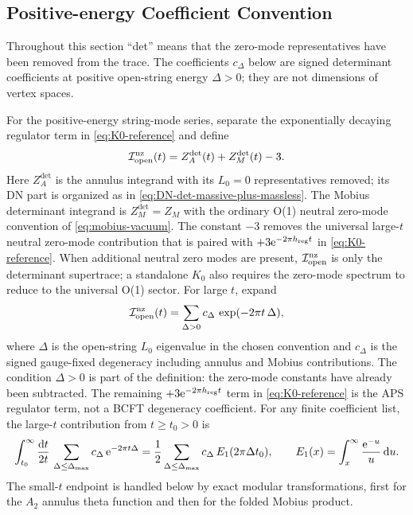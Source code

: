 \documentclass[11pt]{article}
\newcommand{\dd}{\mathrm{d}}
\newcommand{\e}{\mathrm{e}}
\begin{document}
\subsection{Positive-energy Coefficient Convention}

Throughout this section ``det'' means that the zero-mode representatives have been removed from
the trace. The coefficients \(c_\Delta\) below are signed determinant coefficients at positive
open-string energy \(\Delta>0\); they are not dimensions of vertex spaces.

For the positive-energy string-mode series, separate the exponentially decaying regulator term
in \eqref{eq:K0-reference} and define
\begin{equation}
  \mathcal I_{\rm open}^{\rm nz}(t)
  =
  Z_A^{\det}(t)+Z_M^{\det}(t)
  -
  3 .
  \label{eq:open-channel-det-integrand}
\end{equation}
Here \(Z_A^{\det}\) is the annulus integrand with its \(L_0=0\) representatives removed; its DN
part is organized as in \eqref{eq:DN-det-massive-plus-massless}. The Mobius determinant integrand
is \(Z_M^{\det}=Z_M\) with the ordinary O(1) neutral zero-mode convention of
\eqref{eq:mobius-vacuum}. The constant \(-3\) removes the universal large-\(t\) neutral zero-mode
contribution that is paired with \(+3\e^{-2\pi h_{\rm reg}t}\) in \eqref{eq:K0-reference}. When
additional neutral zero modes are present, \(\mathcal I_{\rm open}^{\rm nz}\) is only the
determinant supertrace; a standalone \(K_0\) also requires the zero-mode spectrum to reduce to
the universal O(1) sector. For large \(t\), expand
\begin{equation}
  \mathcal I_{\rm open}^{\rm nz}(t)
  =
  \sum_{\Delta>0} c_\Delta\,\exp(-2\pi t\,\Delta),
  \label{eq:open-channel-q-series-after-subtraction}
\end{equation}
where \(\Delta\) is the open-string \(L_0\) eigenvalue in the chosen convention and
\(c_\Delta\) is the signed gauge-fixed degeneracy including annulus and Mobius contributions.
The condition \(\Delta>0\) is part of the definition: the zero-mode constants have already been
subtracted. The remaining \(+3\e^{-2\pi h_{\rm reg}t}\) term in \eqref{eq:K0-reference} is the
APS regulator term, not a BCFT degeneracy coefficient. For any finite coefficient list, the
large-\(t\) contribution from \(t\ge t_0>0\) is
\begin{equation}
  \int_{t_0}^{\infty}\frac{\dd t}{2t}\,
  \sum_{\Delta\le \Delta_{\rm max}}c_\Delta\,\e^{-2\pi t\Delta}
  =
  \frac12
  \sum_{\Delta\le \Delta_{\rm max}}c_\Delta\,E_1(2\pi\Delta t_0),
  \qquad
  E_1(x)=\int_x^\infty \frac{\e^{-u}}{u}\,\dd u .
  \label{eq:q-series-large-t-E1}
\end{equation}
The small-\(t\) endpoint is handled below by exact modular transformations, first for the
\(A_2\) annulus theta function and then for the folded Mobius product.
\end{document}

